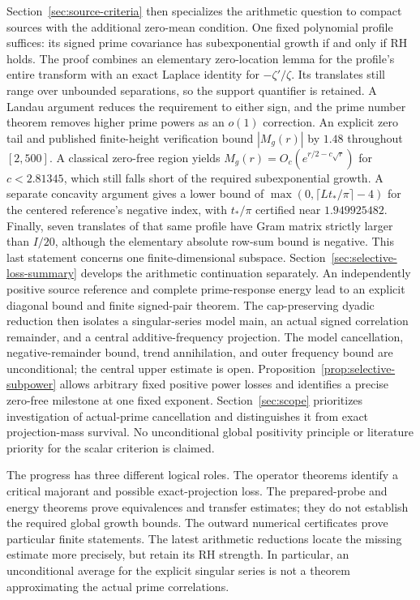 \documentclass[11pt]{article}
\numberwithin{equation}{section}
\theoremstyle{definition}
\theoremstyle{remark}
\newcommand{\Id}{I}
\begin{document}
Section~\ref{sec:source-criteria} then specializes the arithmetic question
to compact sources with the additional zero-mean condition. One fixed
polynomial profile suffices: its signed prime covariance has
subexponential growth if and only if RH holds. The proof combines an
elementary zero-location lemma for the profile's entire transform with an
exact Laplace identity for \(-\zeta'/\zeta\). Its translates still range
over unbounded separations, so the support quantifier is retained.
A Landau argument reduces the requirement to either sign, and the prime
number theorem removes higher prime powers as an \(o(1)\) correction.
An explicit zero tail and published finite-height verification bound
\(|M_g(r)|\) by \(1.48\) throughout \([2,500]\). A classical zero-free
region yields \(M_g(r)=O_c(e^{r/2-c\sqrt r})\) for \(c<2.81345\),
which still falls short of the required subexponential growth.
A separate concavity argument gives a lower bound of
\(\max(0,\lceil Lt_*/\pi\rceil-4)\) for the centered reference's negative
index, with \(t_*/\pi\) certified near \(1.949925482\).
Finally, seven translates of that same profile have Gram matrix strictly
larger than \(\Id/20\), although the elementary absolute row-sum bound is
negative. This last statement concerns one finite-dimensional subspace.
Section~\ref{sec:selective-loss-summary} develops the arithmetic
continuation separately. An independently positive source reference and
complete prime-response energy lead to an explicit diagonal bound and
finite signed-pair theorem. The cap-preserving dyadic reduction then
isolates a singular-series model main, an actual signed correlation
remainder, and a central additive-frequency projection. The model
cancellation, negative-remainder bound, trend annihilation, and outer
frequency bound are unconditional; the central upper estimate is open.
Proposition~\ref{prop:selective-subpower} allows arbitrary fixed positive
power losses and identifies a precise zero-free milestone at one fixed
exponent. Section~\ref{sec:scope} prioritizes investigation of actual-prime
cancellation and distinguishes it from exact projection-mass survival.
No unconditional global positivity principle or literature priority for
the scalar criterion is claimed.

The progress has three different logical roles. The operator theorems
identify a critical majorant and possible exact-projection loss.
The prepared-probe and energy theorems prove equivalences and transfer
estimates; they do not establish the required global growth bounds.
The outward numerical certificates prove particular finite statements.
The latest arithmetic reductions locate the missing estimate more
precisely, but retain its RH strength. In particular, an unconditional
average for the explicit singular series is not a theorem approximating
the actual prime correlations.
\end{document}
